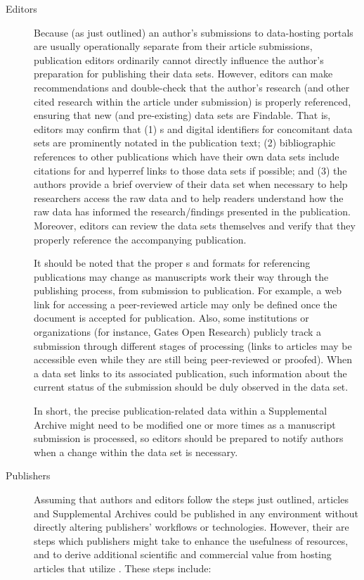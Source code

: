\documentclass[11pt,letterpaper]{article}
\newcommand{\ATexttclr}[1]{\textcolor{tcolor}{\textbf{#1}}}
\newcommand{\URL}{\resizebox{!}{7pt}{\AcronymText{URL}}}
\newcommand{\textscc}[1]{{\color{orr!35!black}{{%
						\fontfamily{Cabin-TLF}\fontseries{b}\selectfont{\textsc{\scriptsize{#1}}}}}}}
\newcommand{\AcronymText}[1]{{\textscc{#1}}}
\newcommand{\SDRF}{\resizebox{!}{8pt}{\ATexttclr{S}}\resizebox{!}{8pt}{\ATexttclr{DR%
\hspace{1pt}{\raisebox{-1pt}{\fontfamily{qhv}\fontseries{b}\selectfont{}\Large{F}}%
}}}}
\begin{document}
{{\begin{description}
\item[Editors]  Because (as just outlined) an author's submissions 
to data-hosting portals are usually operationally separate 
from their article submissions, publication 
editors ordinarily cannot directly influence the author's 
preparation for publishing their data sets.  However, 
editors can make recommendations and double-check that 
the author's research (and other cited research  
within the article under submission) is properly referenced, ensuring 
that new (and pre-existing) data sets are 
Findable.  That is, editors may confirm that (1) \URL{}s 
and digital identifiers for concomitant data sets are prominently 
notated in the publication text; (2) bibliographic 
references to other publications which have their own 
data sets include citations for and hyperref links to 
those data sets if possible; and (3) the authors provide 
a brief overview of their data set when necessary 
to help researchers access the raw data and to help 
readers understand how the raw data has informed the 
research/findings presented in the publication.  
Moreover, editors can review the data sets themselves 
and verify that they 
properly reference the accompanying publication. 

It should be noted that the proper \URL{}s and formats 
for referencing publications may change as manuscripts 
work their way through the publishing process, from 
submission to publication.  
For example, a web link for accessing a peer-reviewed 
article may only be defined once the document is 
accepted for publication.  Also, some institutions 
or organizations  
(for instance, Gates Open Research) 
publicly track a submission through different stages 
of processing (links to articles may be accessible  
even while they are still being peer-reviewed or proofed).  
When a data set links to its associated 
publication, such information about the current 
status of the submission should be duly observed in the 
data set.

In short, the precise publication-related data within a 
Supplemental Archive might need to be modified one 
or more times as a manuscript submission is processed, 
so editors should be prepared to notify authors when 
a change within the data set is necessary.

\item[Publishers]  Assuming that authors and 
editors follow the steps just outlined, 
articles and Supplemental Archives could be 
published in any environment without directly altering 
publishers' workflows or technologies.  
However, their are steps which publishers 
might take to enhance the usefulness of \SDRF{} 
resources, and to derive additional scientific 
and commercial value from hosting articles 
that utilize \SDRF{}.  These steps include:


\end{description}}}
\end{document}
